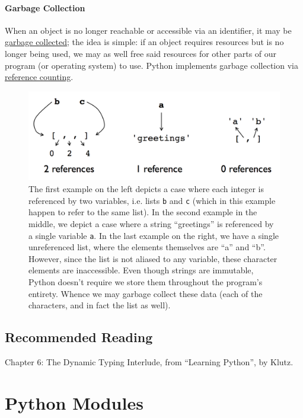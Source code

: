 \documentclass[12pt,letterpaper,twoside]{article}
\begin{document}
\begin{enumerate}
\paragraph{Garbage Collection}
When an object is no longer reachable or accessible via an identifier, it may be \href{https://en.wikipedia.org/wiki/Garbage_collection_(computer_science)}{garbage collected};
the idea is simple: if an object requires resources but is no longer being used, we may as well free said resources for other parts of our program (or operating system) to use. 
Python implements garbage collection via \href{https://en.wikipedia.org/wiki/Reference_counting#Use_in_garbage_collection}{reference counting}.

\begin{figure}[h]
\centering
\includegraphics[scale=0.35]{fig/gc-2.png}
\caption{The first example on the left depicts a case where each integer is referenced by two variables, i.e. 
lists \texttt{b} and \texttt{c} (which in this example happen to refer to the same list). In the second example in the middle, we depict
a case where a string ``greetings'' is referenced by a single variable \texttt{a}. In the last example on the right, we have a single 
unreferenced list, where the elements themselves are ``a'' and ``b''. However, since the list is not aliased to any variable, these 
character elements are inaccessible. Even though strings are immutable, Python doesn't require we store them throughout the program's entirety.
Whence we may garbage collect these data (each of the characters, and in fact the list as well).}
\end{figure}

\subsection{Recommended Reading}
Chapter 6: The Dynamic Typing Interlude, from ``Learning Python'', by Klutz.


\section{Python Modules}


\end{enumerate}
\end{document}
